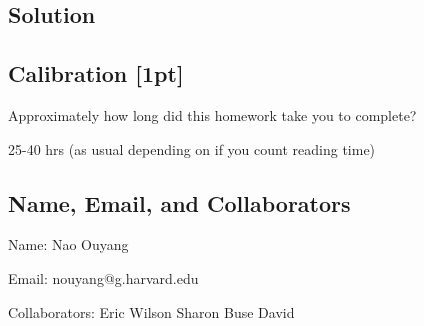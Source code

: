\documentclass[submit]{harvardml}
\newenvironment{answer}{%
    \color{answergreen}\bf}
  {%
  }
\begin{document}
\subsection*{Solution}
    \begin{answer}

    \end{answer}
\newpage


\subsection*{Calibration [1pt]}
Approximately how long did this homework take you to complete?

25-40 hrs (as usual depending on if you count reading time)

\subsection*{Name, Email, and Collaborators}

Name: Nao Ouyang

Email: nouyang@g.harvard.edu    

Collaborators:
Eric
Wilson
Sharon
Buse
David
\end{document}
